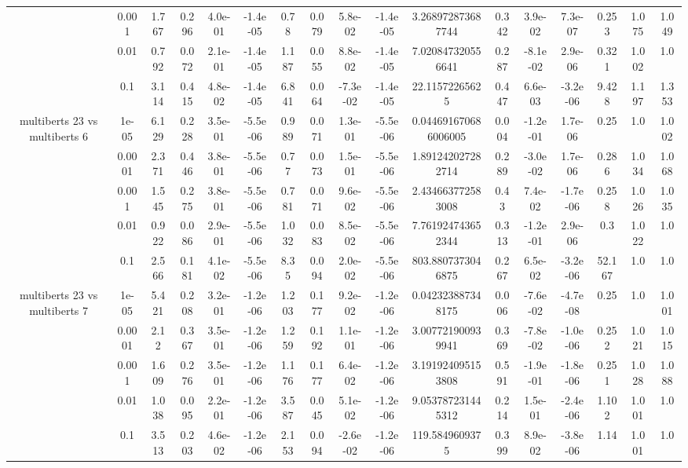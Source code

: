 \begin{tabular}{|c|c|c|c|c|c|c|c|c|c|c|c|c|c|c|c|c|}
 & 0.001 & 1.767 & 0.296 & 4.0e-01 & -1.4e-05 & 0.78 & 0.079 & 5.8e-02 & -1.4e-05 & 3.268972873687744 & 0.342 & 3.9e-02 & 7.3e-07 & 0.253 & 1.075 & 1.049 \\
 & 0.01 & 0.792 & 0.072 & 2.1e-01 & -1.4e-05 & 1.187 & 0.055 & 8.8e-02 & -1.4e-05 & 7.020847320556641 & 0.287 & -8.1e-02 & 2.9e-06 & 0.321 & 1.002 & 1.0 \\
 & 0.1 & 3.114 & 0.415 & 4.8e-02 & -1.4e-05 & 6.841 & 0.064 & -7.3e-02 & -1.4e-05 & 22.11572265625 & 0.447 & 6.6e-03 & -3.2e-06 & 9.428 & 1.197 & 1.353 \\
\hline
\multirow{5}{*}{multiberts 23 vs multiberts 6} & 1e-05 & 6.129 & 0.228 & 3.5e-01 & -5.5e-06 & 0.989 & 0.071 & 1.3e-01 & -5.5e-06 & 0.044691670686006005 & 0.004 & -1.2e-01 & 1.7e-06 & 0.25 & 1.0 & 1.002 \\
 & 0.0001 & 2.371 & 0.446 & 3.8e-01 & -5.5e-06 & 0.77 & 0.073 & 1.5e-01 & -5.5e-06 & 1.891242027282714 & 0.289 & -3.0e-02 & 1.7e-06 & 0.286 & 1.034 & 1.068 \\
 & 0.001 & 1.545 & 0.275 & 3.8e-01 & -5.5e-06 & 0.781 & 0.071 & 9.6e-02 & -5.5e-06 & 2.434663772583008 & 0.43 & 7.4e-02 & -1.7e-06 & 0.258 & 1.026 & 1.035 \\
 & 0.01 & 0.922 & 0.086 & 2.9e-01 & -5.5e-06 & 1.032 & 0.083 & 8.5e-02 & -5.5e-06 & 7.761924743652344 & 0.313 & -1.2e-01 & 2.9e-06 & 0.3 & 1.022 & 1.0 \\
 & 0.1 & 2.566 & 0.181 & 4.1e-02 & -5.5e-06 & 8.35 & 0.094 & 2.0e-02 & -5.5e-06 & 803.8807373046875 & 0.267 & 6.5e-02 & -3.2e-06 & 52.167 & 1.0 & 1.0 \\
\hline
\multirow{5}{*}{multiberts 23 vs multiberts 7} & 1e-05 & 5.421 & 0.208 & 3.2e-01 & -1.2e-06 & 1.203 & 0.177 & 9.2e-02 & -1.2e-06 & 0.042323887348175 & 0.006 & -7.6e-02 & -4.7e-08 & 0.25 & 1.0 & 1.001 \\
 & 0.0001 & 2.12 & 0.367 & 3.5e-01 & -1.2e-06 & 1.259 & 0.192 & 1.1e-01 & -1.2e-06 & 3.007721900939941 & 0.369 & -7.8e-02 & -1.0e-06 & 0.252 & 1.021 & 1.015 \\
 & 0.001 & 1.609 & 0.276 & 3.5e-01 & -1.2e-06 & 1.176 & 0.177 & 6.4e-02 & -1.2e-06 & 3.191924095153808 & 0.591 & -1.9e-01 & -1.8e-06 & 0.251 & 1.028 & 1.088 \\
 & 0.01 & 1.038 & 0.095 & 2.2e-01 & -1.2e-06 & 3.587 & 0.045 & 5.1e-02 & -1.2e-06 & 9.053787231445312 & 0.214 & 1.5e-01 & -2.4e-06 & 1.102 & 1.001 & 1.0 \\
 & 0.1 & 3.513 & 0.203 & 4.6e-02 & -1.2e-06 & 2.153 & 0.094 & -2.6e-02 & -1.2e-06 & 119.5849609375 & 0.399 & 8.9e-02 & -3.8e-06 & 1.14 & 1.001 & 1.0 \\

\end{tabular}
